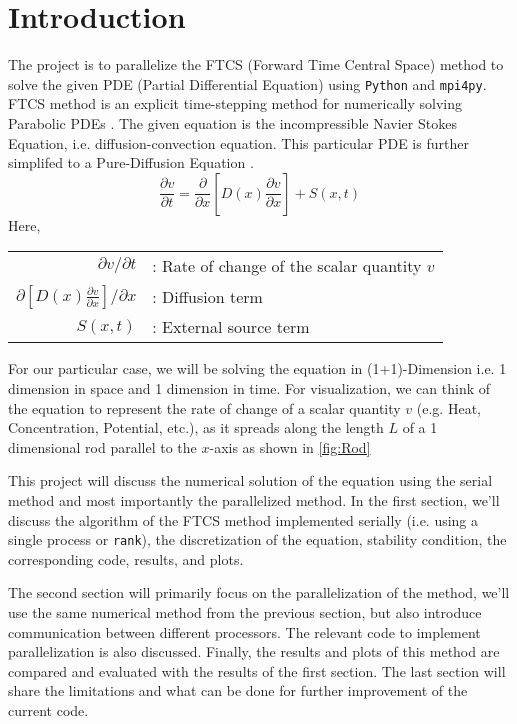\section{Introduction}

The project is to parallelize the FTCS (Forward Time Central Space) method to solve the given PDE (Partial Differential Equation) using \texttt{Python} and \texttt{mpi4py}. FTCS method is an explicit time-stepping method for numerically solving Parabolic PDEs \cite{tannehill}. The given equation is the incompressible Navier Stokes Equation, i.e. diffusion-convection equation. This particular PDE is further simplifed to a Pure-Diffusion Equation \cite{paper}.
\begin{equation}
    \displaystyle{\frac{\partial v}{\partial t} = \frac{\partial}{\partial x}\left[D(x)\frac{\partial v}{\partial x}\right]+ S(x,t)}
    \label{eq:De}
\end{equation}
Here,
\begin{table*}[h]
    \raggedright
    \begin{tabular}{rl}
        $\partial v/\partial t$ &: Rate of change of the scalar quantity $v$ \\ 
        $\partial [D(x) \frac{\partial v}{\partial x}]$/$\partial x$  &: Diffusion term \\ 
        $S(x,t)$ &: External source term
    \end{tabular}
\end{table*}

For our particular case, we will be solving the equation in (1+1)-Dimension i.e. 1 dimension in space and 1 dimension in time. For visualization, we can think of the equation to represent the rate of change of a scalar quantity $v$ (e.g. Heat, Concentration, Potential, etc.), as it spreads along the length $L$ of a 1 dimensional rod parallel to the $x$-axis as shown in \autoref{fig:Rod}



\figRod

This project will discuss the numerical solution of the equation using the serial method and most importantly the parallelized method. In the first section, we'll discuss the algorithm of the FTCS method implemented serially (i.e. using a single process or \texttt{rank}), the discretization of the equation, stability condition, the corresponding code, results, and plots.

The second section will primarily focus on the parallelization of the method, we'll use the same numerical method from the previous section, but also introduce communication between different processors. The relevant code to implement parallelization is also discussed. Finally, the results and plots of this method are compared and evaluated with the results of the first section. The last section will share the limitations and what can be done for further improvement of the current code.


